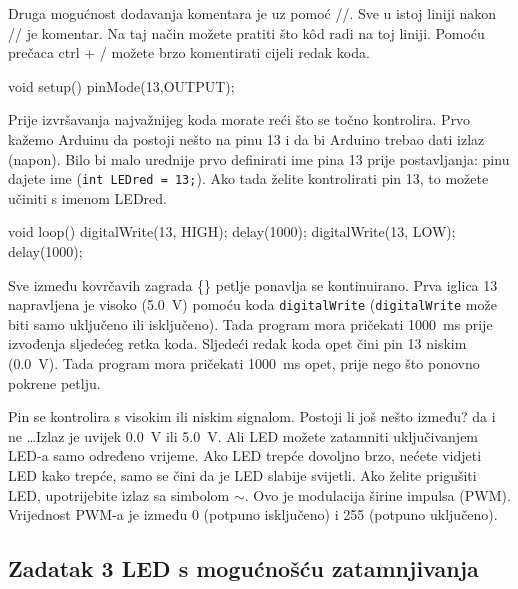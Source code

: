 \documentclass{arduino}
\begin{document}
Druga mogućnost dodavanja komentara je uz pomoć //. Sve u istoj liniji nakon // je komentar. Na taj način možete pratiti što kôd radi na toj liniji. Pomoću prečaca ctrl + / možete brzo komentirati cijeli redak koda.
\begin{marginlisting}
void setup(){
  pinMode(13,OUTPUT);
}
\end{marginlisting}

Prije izvršavanja najvažnijeg koda morate reći što se točno kontrolira. Prvo kažemo Arduinu da postoji nešto na pinu 13 i da bi Arduino trebao dati izlaz (napon). Bilo bi malo urednije prvo definirati ime pina 13 prije postavljanja: pinu dajete ime (\lstinline{int LEDred = 13;}). Ako tada želite kontrolirati pin 13, to možete učiniti s imenom LEDred.
\begin{marginlisting}
void loop() {
  digitalWrite(13, HIGH);
  delay(1000);
  digitalWrite(13, LOW);
  delay(1000);
}
\end{marginlisting}

Sve između kovrčavih zagrada \{\} petlje ponavlja se kontinuirano. Prva iglica 13 napravljena je visoko (\SI{5.0}{\volt}) pomoću koda \lstinline{digitalWrite} (\lstinline{digitalWrite} može biti samo uključeno ili isključeno). Tada program mora pričekati \SI{1000}{\milli\s} prije izvođenja sljedećeg retka koda. Sljedeći redak koda opet čini pin 13 niskim (\SI{0.0}{\volt}). Tada program mora pričekati \SI{1000}{\milli\s} opet, prije nego što ponovno pokrene petlju.


Pin se kontrolira s visokim ili niskim signalom. Postoji li još nešto između? da i ne \dots Izlaz je uvijek \SI{0.0}{\volt} ili \SI{5.0}{\volt}. Ali LED možete zatamniti uključivanjem LED-a samo određeno vrijeme. Ako LED trepće dovoljno brzo, nećete vidjeti LED kako trepće, samo se čini da je LED slabije svijetli. Ako želite prigušiti LED, upotrijebite izlaz sa simbolom $\sim$. Ovo je modulacija širine impulsa (PWM). Vrijednost PWM-a je između 0 (potpuno isključeno) i 255 (potpuno uključeno).
\newpage

\subsection{Zadatak 3 LED s mogućnošću zatamnjivanja}

\end{document}
